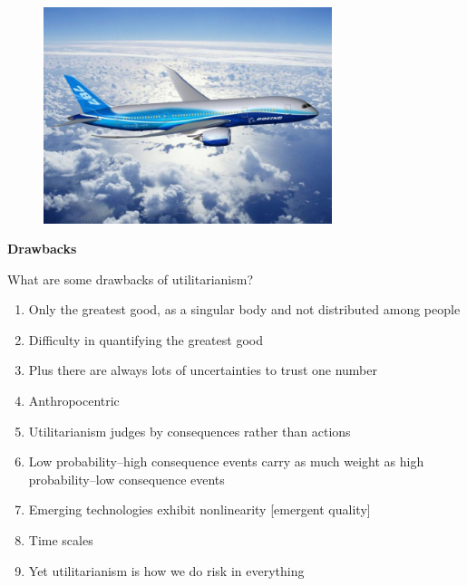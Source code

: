 \documentclass[aspectratio=1610,pdftex,dvipsnames,compress,xcolor={dvipsnames}]{beamer}
\begin{document}
\addtocounter{framenumber}{-1}
\begin{frame}{}
    \begin{figure}
        \centering
        \includegraphics[width=0.75\textwidth]{dreamliner.jpg}
    \end{figure}
\end{frame}


\begin{frame}[plain]{}
    \centering\LARGE\textbf{Drawbacks}
\end{frame}


\addtocounter{framenumber}{-1}
\begin{frame}{What are some drawbacks of utilitarianism?}
    \begin{enumerate}[series=outerlist,topsep=0pt,itemsep=11pt,leftmargin=*,label=(\arabic*)]
        \item[]Only the greatest good, as a singular body and not distributed among people
        \item[]Difficulty in quantifying the greatest good
        \item[]Plus there are always lots of uncertainties to trust one number
        \item[]Anthropocentric
        \item[]Utilitarianism judges by consequences rather than actions
        \item[]Low probability--high consequence events carry as much weight as high probability--low consequence events
        \item[]Emerging technologies exhibit nonlinearity [emergent quality]
        \item[]Time scales
        \item[]Yet utilitarianism is how we do risk in everything
    \end{enumerate}
\end{frame}
\end{document}
